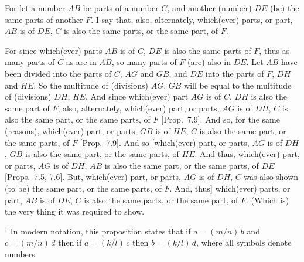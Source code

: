 \begin{Parallel}{}{}
{For let a number $AB$ be parts of a number $C$, and another (number)
$DE$ (be) the same parts of another $F$. I say that, also, alternately, which(ever)
parts, or part, $AB$ is of $DE$, $C$ is also the same parts, or the same part,
of $F$.

\epsfysize=2in
\centerline{}

For since which(ever) parts $AB$ is of $C$, $DE$ is also the same parts of $F$,
thus as many parts of $C$ as are in $AB$, so many parts of $F$ (are)
also in $DE$. Let $AB$ have been divided into the parts of $C$, $AG$ and $GB$, and
$DE$ into the parts of $F$, $DH$ and $HE$.  So the multitude of
(divisions) $AG$, $GB$ will be equal to the multitude of (divisions) $DH$, $HE$.
And since which(ever) part $AG$ is of $C$, $DH$ is also the same part of $F$,
also, alternately, which(ever) part, or parts, $AG$ is
of $DH$, $C$ is also the same part, or the same parts, of $F$  [Prop.~7.9]. And so, for the same (reasons), 
which(ever) part, or parts, $GB$ is of $HE$, $C$ is also the same
part, or the same parts, of $F$ [Prop.~7.9]. And so [which(ever) part, or parts, $AG$ is of
$DH$, $GB$ is also the same part, or the same parts, of $HE$. And thus,
which(ever) part, or parts, $AG$ is of $DH$, $AB$ is also the same part, or the
same parts, of $DE$ [Props.~7.5, 7.6]. But, which(ever) part, or parts, $AG$ is of $DH$, $C$ was also
shown (to be) the same part, or the same parts, of $F$. And, thus] which(ever)
parts, or part, $AB$ is of $DE$, $C$ is also the  same parts, or the same part, of $F$. (Which
is) the very thing it was required to show.}
\end{Parallel}
{\footnotesize\noindent$^\dag$ In modern notation, this
proposition states that if $a=(m/n)\,b$ and $c=(m/n)\,d$ then if $a=(k/l)\,c$
then $b = (k/l)\,d$, where all symbols denote numbers.}

